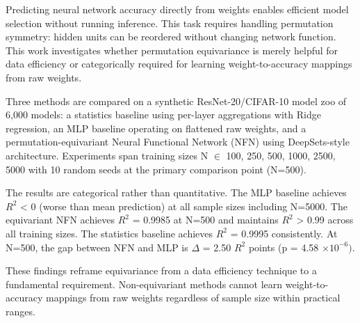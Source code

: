 
Predicting neural network accuracy directly from weights enables efficient model selection without running inference. This task requires handling permutation symmetry: hidden units can be reordered without changing network function. This work investigates whether permutation equivariance is merely helpful for data efficiency or categorically required for learning weight-to-accuracy mappings from raw weights.

Three methods are compared on a synthetic ResNet-20/CIFAR-10 model zoo of 6,000 models: a statistics baseline using per-layer aggregations with Ridge regression, an MLP baseline operating on flattened raw weights, and a permutation-equivariant Neural Functional Network (NFN) using DeepSets-style architecture. Experiments span training sizes N $\in$ {100, 250, 500, 1000, 2500, 5000} with 10 random seeds at the primary comparison point (N=500).

The results are categorical rather than quantitative. The MLP baseline achieves $R^2$ < 0 (worse than mean prediction) at all sample sizes including N=5000. The equivariant NFN achieves $R^2$ = 0.9985 at N=500 and maintains $R^2$ > 0.99 across all training sizes. The statistics baseline achieves $R^2$ = 0.9995 consistently. At N=500, the gap between NFN and MLP is $\Delta$ = 2.50 $R^2$ points (p = 4.58 $\times 10^{-6})$.

These findings reframe equivariance from a data efficiency technique to a fundamental requirement. Non-equivariant methods cannot learn weight-to-accuracy mappings from raw weights regardless of sample size within practical ranges.
